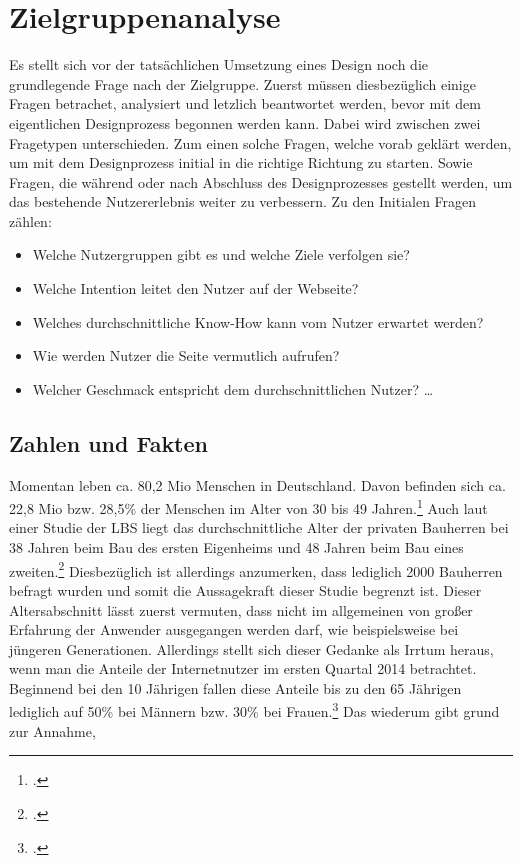 \section{Zielgruppenanalyse}
Es stellt sich vor der tatsächlichen Umsetzung eines Design noch die grundlegende Frage nach der Zielgruppe. Zuerst müssen diesbezüglich einige Fragen betrachet, analysiert und letzlich beantwortet werden, bevor mit dem eigentlichen Designprozess begonnen werden kann. Dabei wird zwischen zwei Fragetypen unterschieden. Zum einen solche Fragen, welche vorab geklärt werden, um mit dem Designprozess initial in die richtige Richtung zu starten. Sowie Fragen, die während oder nach Abschluss des Designprozesses gestellt werden, um das bestehende Nutzererlebnis weiter zu verbessern.
Zu den Initialen Fragen zählen: 
\begin{itemize}
	\item Welche Nutzergruppen gibt es und welche Ziele verfolgen sie?
	\item Welche Intention leitet den Nutzer auf der Webseite?
	\item Welches durchschnittliche Know-How kann vom Nutzer erwartet werden? 
	\item Wie werden Nutzer die Seite vermutlich aufrufen? 
	\item Welcher Geschmack entspricht dem durchschnittlichen Nutzer? \ldots
\end{itemize}
\subsection{Zahlen und Fakten}
Momentan leben ca. 80,2 Mio Menschen in Deutschland. Davon befinden sich ca. 22,8 Mio bzw. 28,5\% der Menschen im Alter von 30 bis 49 Jahren.\footcite[vgl.][]{zensus2011:alter} Auch laut einer Studie der LBS liegt das durchschnittliche Alter der privaten Bauherren bei 38 Jahren beim Bau des ersten Eigenheims und 48 Jahren beim Bau eines zweiten.\footcite[vgl.][]{lbs} Diesbezüglich ist allerdings anzumerken, dass lediglich 2000 Bauherren befragt wurden und somit die Aussagekraft dieser Studie begrenzt ist. 
Dieser Altersabschnitt lässt zuerst vermuten, dass nicht im allgemeinen von großer Erfahrung der Anwender ausgegangen werden darf, wie beispielsweise bei jüngeren Generationen. Allerdings stellt sich dieser Gedanke als Irrtum heraus, wenn man die Anteile der Internetnutzer im ersten Quartal 2014 betrachtet. Beginnend bei den 10 Jährigen fallen diese Anteile bis zu den 65 Jährigen lediglich auf 50\% bei Männern bzw. 30\% bei Frauen.\footcite[vgl.][]{stabu} Das wiederum gibt grund zur Annahme, 

